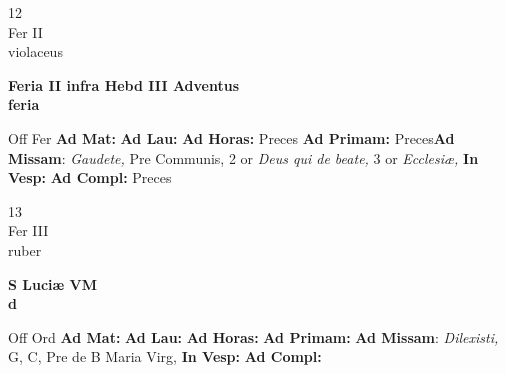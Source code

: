 \documentclass[10pt, openany]{book}
\begin{document}
    \begin{center}
        \begin{minipage}{3.5in}
            \vspace{2em}
            \begin{minipage}{0.5in}
                {\Huge 12} \\
                {\normalsize Fer II} \\
                {\normalsize violaceus}
            \end{minipage}
            \begin{minipage}{3.0in}
                \textbf{ \large Feria II infra Hebd III Adventus \\
                \textnormal{\normalsize feria}} \\ 
            \end{minipage}
            \begin{justify}Off Fer
                \textbf{Ad Mat: }
                \textbf{Ad Lau: }
                \textbf{Ad Horas: }Preces
                \textbf{Ad Primam: }Preces\textbf{Ad Missam}: \textit{Gaudete,} Pre Communis, 2 or \textit{Deus qui de beate,} 3 or \textit{Ecclesiæ,}  
                \textbf{In Vesp: }
                \textbf{Ad Compl: }Preces
            \end{justify}
        \end{minipage}
    \end{center}

    \begin{center}
        \begin{minipage}{3.5in}
            \vspace{2em}
            \begin{minipage}{0.5in}
                {\Huge 13} \\
                {\normalsize Fer III} \\
                {\normalsize ruber}
            \end{minipage}
            \begin{minipage}{3.0in}
                \textbf{ \large S Luciæ VM \\
                \textnormal{\normalsize d}} \\ 
            \end{minipage}
            \begin{justify}Off Ord
                \textbf{Ad Mat: }
                \textbf{Ad Lau: }
                \textbf{Ad Horas: }
                \textbf{Ad Primam: }\textbf{Ad Missam}: \textit{Dilexisti,} G, C, Pre de B Maria Virg,  
                \textbf{In Vesp: }
                \textbf{Ad Compl: }
            \end{justify}
        \end{minipage}
    \end{center}
\end{document}
